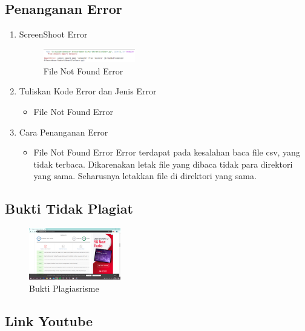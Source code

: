 \subsection{Penanganan Error}
\begin{enumerate}
\item ScreenShoot Error
	\begin{figure}[H]
		\includegraphics[width=4cm]{figures/1174053/4/error.png}
		\centering
		\caption{File Not Found Error}
	\end{figure}

	\item Tuliskan Kode Error dan Jenis Error
	\begin{itemize}
		\item File Not Found Error

	\end{itemize}
	\item Cara Penanganan Error
	\begin{itemize}
		\item File Not Found Error
		\hfill\break
		Error terdapat pada kesalahan baca file csv, yang tidak terbaca. Dikarenakan letak file yang dibaca tidak para direktori yang sama. Seharusnya letakkan file di direktori yang sama. 
	\end{itemize}
\end{enumerate}


\subsection{Bukti Tidak Plagiat}
\begin{figure}[H]
	\includegraphics[width=4cm]{figures/1174053/4/plagiarisme.png}
	\centering
	\caption{Bukti Plagiasrisme}
\end{figure}

\subsection{Link Youtube}
